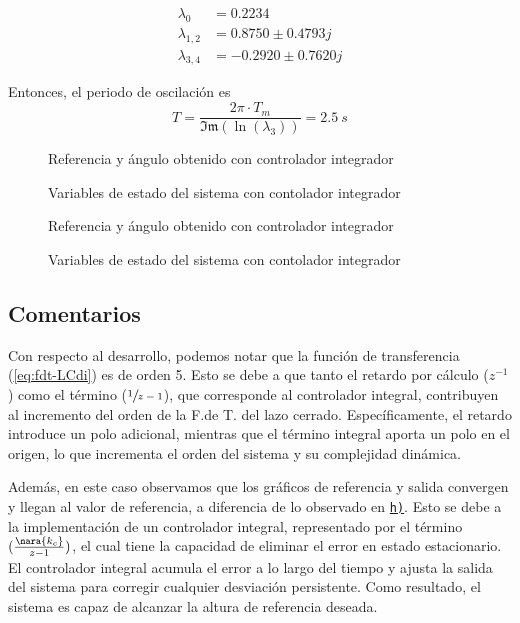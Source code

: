 \begin{align*}
  \lambda_{0} &= 0.2234\\
  \lambda_{1,2} &= 0.8750 \pm 0.4793j\\
  \lambda_{3,4} &= -0.2920 \pm 0.7620j
\end{align*}


Entonces, el periodo de oscilación es
\begin{equation}
    T = \frac{2\pi \cdot T_{m}}{\mathfrak{Im}(\ln(\lambda_{3}))} = 2.5\ \unit{s} 
\end{equation}

\begin{figure}[h]
    \centering
    
    \caption{Referencia y ángulo obtenido con controlador integrador}\label{fig:psi-int-disc}
\end{figure}

\begin{figure}[h]
  \centering
  
  \caption{Variables de estado del sistema con contolador integrador}\label{fig:estado-int-disc}
\end{figure}

\begin{figure}[h]
    \centering
    
    \caption{Referencia y ángulo obtenido con controlador integrador}\label{fig:psi-int-disc-marge}
\end{figure}

\begin{figure}[h]
  \centering
  
  \caption{Variables de estado del sistema con contolador integrador}\label{fig:estado-int-disc-marge}
\end{figure}
  
\FloatBarrier


\subsection{Comentarios}


Con respecto al desarrollo, podemos notar que la función de transferencia 
(\eqref{eq:fdt-LCdi}) es de orden 5. Esto se debe a que tanto el retardo por 
cálculo ($z^{-1}$) como el término ($\sfrac{1}{z-1}$), que corresponde al 
controlador integral, contribuyen al incremento del orden de la F.de T. del 
lazo cerrado. Específicamente, el retardo introduce un polo adicional, mientras 
que el término integral aporta un polo en el origen, lo que incrementa el orden 
del sistema y su complejidad dinámica.

Además, en este caso observamos que los gráficos de referencia y salida 
convergen y llegan al valor de referencia, a diferencia de lo observado en 
\hyperref[pregunta-h]{\texttt{h)}}. Esto se debe a la implementación de un 
controlador integral, representado por el término $(\frac{\nara{k_c}}{z-1}
)$, el cual tiene la capacidad de eliminar el error en estado 
estacionario. El controlador integral acumula el error a lo largo del tiempo y 
ajusta la salida del sistema para corregir cualquier desviación persistente. 
Como resultado, el sistema es capaz de alcanzar la altura de referencia deseada.

